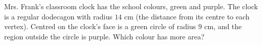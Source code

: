 Mrs. Frank's classroom clock has the school colours, green and purple. The clock is a regular dodecagon with radius $14$ cm (the distance from its centre to each vertex). Centred on the clock's face is a green circle of radius $9$ cm, and the region outside the circle is purple. Which colour has more area?
